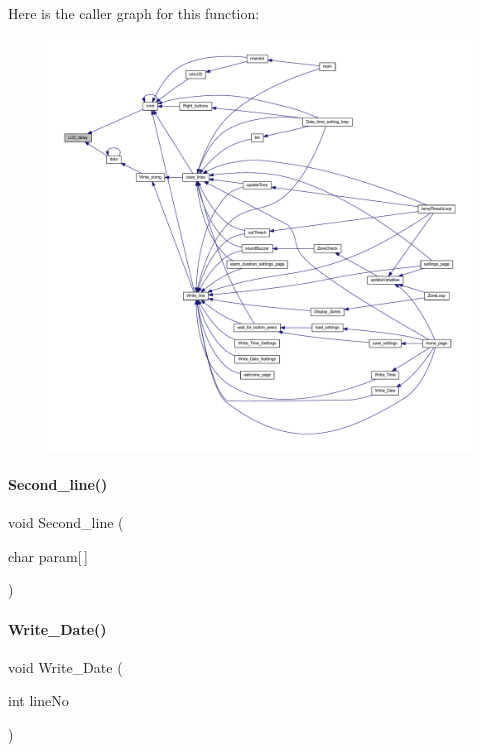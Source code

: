 Here is the caller graph for this function\+:
\nopagebreak
\begin{figure}[H]
\begin{center}
\leavevmode
\includegraphics[width=350pt]{a00035_a43354028a3c697c67905dc7e55e6de8d_icgraph}
\end{center}
\end{figure}
\mbox{\label{a00035_a018fa733ae6a6a56a41b0a193cc04724}} 
\paragraph{Second\+\_\+line()}
{\footnotesize\ttfamily void Second\+\_\+line (\begin{DoxyParamCaption}\item[{char}]{param[$\,$] }\end{DoxyParamCaption})}

\mbox{\label{a00035_a897e97006c9f0d112306aac62288d408}} 
\paragraph{Write\+\_\+\+Date()}
{\footnotesize\ttfamily void Write\+\_\+\+Date (\begin{DoxyParamCaption}\item[{int}]{line\+No }\end{DoxyParamCaption})}

